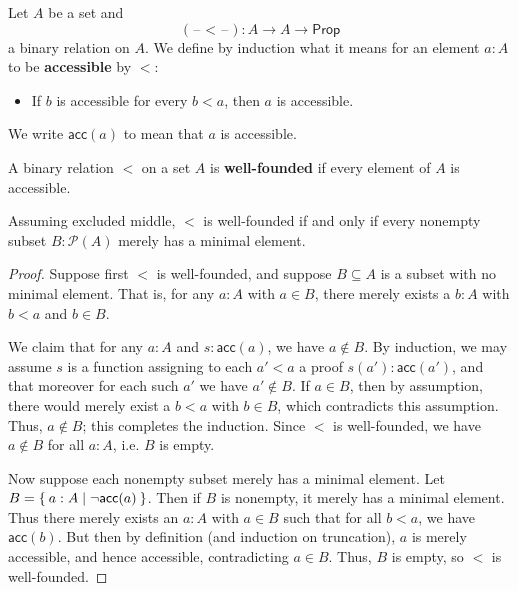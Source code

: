 \documentclass[10pt,a4paper]{article}
\providecommand{\index}[1]{}
\newcommand{\define}[1]{\textbf{#1}}
\let\setof\Set    %
\newcommand{\prop}{\ensuremath{\mathsf{Prop}}\xspace}
\newcommand{\blank}{\mathord{\hspace{1pt}\text{--}\hspace{1pt}}}
\newcommand{\acc}{\ensuremath{\mathsf{acc}}} %
\newcommand{\power}[1]{\mathcal{P}(#1)} %
\theoremstyle{definition}
\theoremstyle{remark}
\numberwithin{equation}{section}
\newcommand{\indexdef}[1]{\index{#1|defstyle}}   %
\newcommand{\indexsee}[2]{\index{#1|see{#2}}}    %
\begin{document}
\begin{defn}\label{defn:accessibility}
  Let $A$ be a set and
  \[(\blank<\blank):A\to A\to \prop\]
  a binary relation on $A$.
  We define by induction what it means for an element $a:A$ to be \define{accessible}
  \indexdef{accessibility}%
  \indexsee{accessible}{accessibility}%
  by $<$:
  \begin{itemize}
  \item If $b$ is accessible for every $b<a$, then $a$ is accessible.
  \end{itemize}
  We write $\acc(a)$ to mean that $a$ is accessible.
\end{defn}

\begin{defn}
  A binary relation $<$ on a set $A$ is \define{well-founded}
  \indexdef{relation!well-founded}%
  \indexdef{well-founded!relation}%
  if every element of $A$ is accessible.
\end{defn}

\begin{lem}\label{thm:wfmin}
  \index{excluded middle}%
  Assuming excluded middle, $<$ is well-founded if and only if every nonempty subset $B: \power A$ merely has a minimal element.
\end{lem}

\begin{proof}
  Suppose first $<$ is well-founded, and suppose $B\subseteq A$ is a subset with no minimal element.
  That is, for any $a:A$ with $a\in B$, there merely exists a $b:A$ with $b<a$ and $b\in B$.

  We claim that for any $a:A$ and $s:\acc(a)$, we have $a\notin B$.
  By induction, we may assume $s$ is a function assigning to each $a'<a$ a proof $s(a'):\acc(a')$, and that moreover for each such $a'$ we have $a'\notin B$.
  If $a\in B$, then by assumption, there would merely exist a $b<a$ with $b\in B$, which contradicts this assumption.
  Thus, $a\notin B$; this completes the induction.
  Since $<$ is well-founded, we have $a\notin B$ for all $a:A$, i.e. $B$ is empty.

  Now suppose each nonempty subset merely has a minimal element.
  Let $B = \setof{ a:A | \neg \acc(a) }$.
  Then if $B$ is nonempty, it merely has a minimal element.
  Thus there merely exists an $a:A$ with $a\in B$ such that for all $b<a$, we have $\acc(b)$.
  But then by definition (and induction on truncation), $a$ is merely accessible, and hence accessible, contradicting $a\in B$.
  Thus, $B$ is empty, so $<$ is well-founded.
\end{proof}
\end{document}
